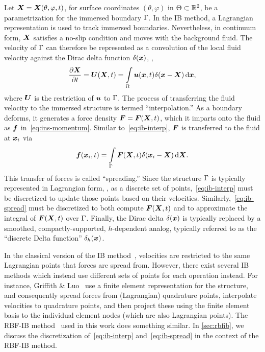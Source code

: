 Let $\boldsymbol{X} = \boldsymbol{X}(\theta, \varphi, t)$, for surface coordinates $(\theta, \varphi)$ in $\Theta\subset\mathbb{R}^2$, be a
parametrization for the immersed boundary $\Gamma$. In the IB method, a Lagrangian representation is used to
track immersed boundaries.  Nevertheless, in continuum form, $\boldsymbol{X}$ satisfies a no-slip condition and moves with the
background fluid. The velocity of $\Gamma$ can therefore be represented as a convolution of the local fluid
velocity against the Dirac delta function $\delta(\boldsymbol{x})$, ,
\begin{equation}\label{eq:ib-interp}
    \frac{\partial \X}{\partial t} = \U(\X, t) %
        = \int\limits_{\domain} \u(\x, t) \Dirac(\x-\X) \d\x,
\end{equation}
where $\boldsymbol{U}$ is the restriction of $\boldsymbol{u}$ to $\Gamma$.
The process of transferring the fluid velocity to the immersed structure is termed ``interpolation\qend.'' %
As a boundary deforms, it generates a force density $\boldsymbol{F} = \boldsymbol{F}(\boldsymbol{X}, t)$, which it imparts onto
the fluid as $\boldsymbol{f}$ in~\eqref{eq:ins-momentum}. Similar to~\eqref{eq:ib-interp}, $\boldsymbol{F}$ is transferred to the fluid at
$\boldsymbol{x}_i$ via
\begin{equation}\label{eq:ib-spread}
        \f(\x_i, t)
        = \int\limits_{\interface} \F(\X, t)\Dirac(\x_i-\X) \d\X.
\end{equation}
This transfer of forces is called ``spreading\qend.'' Since the structure $\Gamma$ is typically represented in
Lagrangian form, , as a discrete set of points,~\eqref{eq:ib-interp} must be discretized to update
those points based on their velocities. Similarly,~\eqref{eq:ib-spread} must be discretized to both compute
$\boldsymbol{F}(\boldsymbol{X}, t)$ and to approximate the integral of $\boldsymbol{F}(\boldsymbol{X}, t)$ over $\Gamma$. Finally, the Dirac delta
$\delta(\boldsymbol{x})$ is typically replaced by a smoothed, compactly-supported, $h$-dependent analog, typically referred to
as the ``discrete Delta function'' $\delta_h(\boldsymbol{x})$.

In the classical version of the IB method~\cite{Peskin:2002go}, velocities are restricted to the same Lagrangian
points that forces are spread from.  However, there exist several IB methods which instead use different sets of
points for each operation instead. For instance, Griffith \& Luo~\cite{Griffith:2017id} use a finite element
representation for the structure, and consequently spread forces from (Lagrangian) quadrature points, interpolate
velocities to quadrature points, and then project these using the finite element basis to the individual element
nodes (which are also Lagrangian points). The RBF-IB method~\cite{Shankar:2015km} used in this work does something
similar. In \cref{sec:rbfib}, we discuss the discretization of~\eqref{eq:ib-interp} and~\eqref{eq:ib-spread} in
the context of the RBF-IB method.

